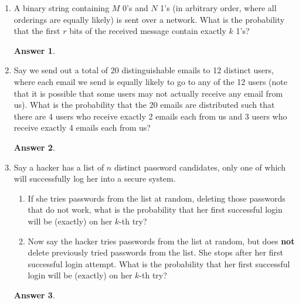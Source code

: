 \documentclass[12pt]{article}
\renewcommand{\(}{\left(}
\renewcommand{\)}{\right)}
\theoremstyle{definition}
\newtheorem*{answer}{Answer}
\begin{document}
\begin{enumerate}
\item A binary string containing $M$  0's and $N$  1's (in arbitrary order, where all orderings are equally likely) is sent over a network.  What is the probability that the first $r$ bits of the received message contain exactly $k$  1's?

    \begin{shaded}
    \begin{answer}

    \end{answer}
    \end{shaded}
    \newpage


\item Say we send out a total of 20 distinguishable emails to 12 distinct users, where each email we send is equally likely to go to any of the 12 users (note that it is possible that some users may not actually receive any email from us).  What is the probability that the 20 emails are distributed such that there are 4 users who receive exactly 2 emails each from us and 3 users who receive exactly 4 emails each from us?

    \begin{shaded}
    \begin{answer}

    \end{answer}
    \end{shaded}
    \newpage


\item Say a hacker has a list of $n$ distinct password candidates, only one of which will successfully log her into a secure system.
    \begin{enumerate}[label=\alph*.]

    \item If she tries passwords from the list at random, deleting those passwords that do not work, what is the probability that her first successful login will be (exactly) on her $k$-th try?
    \item Now say the hacker tries passwords from the list at random, but does \textbf{not} delete previously tried passwords from the list. She stops after her first successful login attempt.  What is the probability that her first successful login will be (exactly) on her $k$-th try?

    \end{enumerate}

    \begin{shaded}
    \begin{answer}


\end{answer}
\end{shaded}
\end{enumerate}
\end{document}
